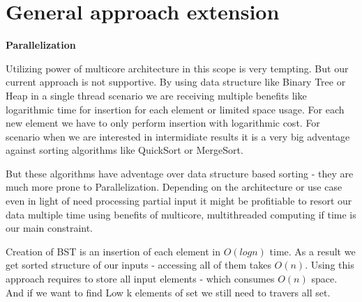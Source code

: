 \section*{General approach extension}
\noindent \textbf{Parallelization}

Utilizing power of multicore architecture in this scope is very tempting.
But our current approach is not supportive. By using data structure like Binary Tree
or Heap in a single thread scenario we are receiving multiple benefits like logarithmic time 
for insertion for each element or limited space usage. For each new element we have to only perform
insertion with logarithmic cost. For scenario when we are interested in intermidiate results it is 
a very big adventage against sorting algorithms like QuickSort or MergeSort.

But these algorithms have adventage over data structure based sorting - they are much
more prone to Parallelization. Depending on the architecture or use case even in light 
of need processing partial input it might be profitiable to resort our data multiple
time using benefits of multicore, multithreaded computing if time is our main constraint.

Creation of BST is an insertion of each element in $O(log{}n)$ time. As a result 
we get sorted structure of our inputs - accessing all of them takes $O(n)$.
Using this approach requires to store all input elements - which consumes $O(n)$ space. 
And if we want to find Low k elements of set we still need to travers all set.

